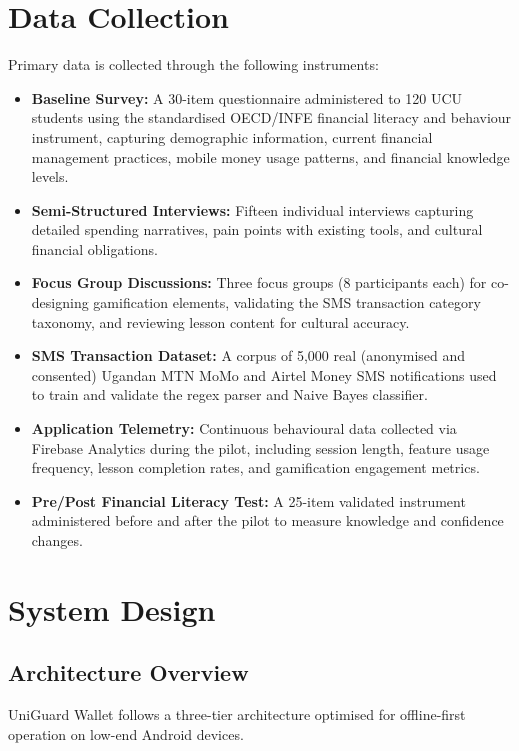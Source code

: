 \documentclass[12pt,a4paper]{report}
\begin{document}
\section{Data Collection}

Primary data is collected through the following instruments:

\begin{itemize}
    \item \textbf{Baseline Survey:} A 30-item questionnaire administered to 120 UCU students using the standardised OECD/INFE financial literacy and behaviour instrument, capturing demographic information, current financial management practices, mobile money usage patterns, and financial knowledge levels.
    \item \textbf{Semi-Structured Interviews:} Fifteen individual interviews capturing detailed spending narratives, pain points with existing tools, and cultural financial obligations.
    \item \textbf{Focus Group Discussions:} Three focus groups (8 participants each) for co-designing gamification elements, validating the SMS transaction category taxonomy, and reviewing lesson content for cultural accuracy.
    \item \textbf{SMS Transaction Dataset:} A corpus of 5,000 real (anonymised and consented) Ugandan MTN MoMo and Airtel Money SMS notifications used to train and validate the regex parser and Naive Bayes classifier.
    \item \textbf{Application Telemetry:} Continuous behavioural data collected via Firebase Analytics during the pilot, including session length, feature usage frequency, lesson completion rates, and gamification engagement metrics.
    \item \textbf{Pre/Post Financial Literacy Test:} A 25-item validated instrument administered before and after the pilot to measure knowledge and confidence changes.
\end{itemize}

\section{System Design}

\subsection{Architecture Overview}

UniGuard Wallet follows a three-tier architecture optimised for offline-first operation
on low-end Android devices.
\end{document}
